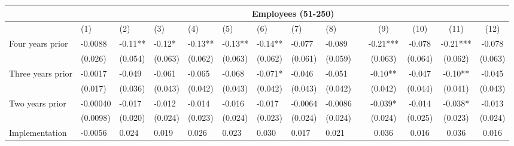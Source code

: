 \begin{tabular}{lccccrrrrrcccc}
\toprule
      & \multicolumn{13}{c}{Employees (51-250)} \\
\midrule
      & \multicolumn{1}{l}{(1)} & \multicolumn{1}{l}{(2)} & \multicolumn{1}{l}{(3)} & \multicolumn{1}{l}{(4)} & \multicolumn{1}{l}{(5)} & \multicolumn{1}{l}{(6)} & \multicolumn{1}{l}{(7)} & \multicolumn{1}{l}{(8)} &       & (9)   & (10)  & (11)  & (12) \\
\midrule
\midrule
Four years prior & \multicolumn{1}{l}{-0.0088} & \multicolumn{1}{l}{-0.11**} & \multicolumn{1}{l}{-0.12*} & \multicolumn{1}{l}{-0.13**} & \multicolumn{1}{l}{-0.13**} & \multicolumn{1}{l}{-0.14**} & \multicolumn{1}{l}{-0.077} & \multicolumn{1}{l}{-0.089} &       & -0.21*** & -0.078 & -0.21*** & -0.078 \\
      & \multicolumn{1}{l}{(0.026)} & \multicolumn{1}{l}{(0.054)} & \multicolumn{1}{l}{(0.063)} & \multicolumn{1}{l}{(0.062)} & \multicolumn{1}{l}{(0.063)} & \multicolumn{1}{l}{(0.062)} & \multicolumn{1}{l}{(0.061)} & \multicolumn{1}{l}{(0.059)} &       & (0.063) & (0.064) & (0.062) & (0.063) \\
Three years prior & \multicolumn{1}{l}{-0.0017} & \multicolumn{1}{l}{-0.049} & \multicolumn{1}{l}{-0.061} & \multicolumn{1}{l}{-0.065} & \multicolumn{1}{l}{-0.068} & \multicolumn{1}{l}{-0.071*} & \multicolumn{1}{l}{-0.046} & \multicolumn{1}{l}{-0.051} &       & -0.10** & -0.047 & -0.10** & -0.045 \\
      & \multicolumn{1}{l}{(0.017)} & \multicolumn{1}{l}{(0.036)} & \multicolumn{1}{l}{(0.043)} & \multicolumn{1}{l}{(0.042)} & \multicolumn{1}{l}{(0.043)} & \multicolumn{1}{l}{(0.042)} & \multicolumn{1}{l}{(0.043)} & \multicolumn{1}{l}{(0.042)} &       & (0.042) & (0.044) & (0.041) & (0.043) \\
Two years prior & \multicolumn{1}{l}{-0.00040} & \multicolumn{1}{l}{-0.017} & \multicolumn{1}{l}{-0.012} & \multicolumn{1}{l}{-0.014} & \multicolumn{1}{l}{-0.016} & \multicolumn{1}{l}{-0.017} & \multicolumn{1}{l}{-0.0064} & \multicolumn{1}{l}{-0.0086} &       & -0.039* & -0.014 & -0.038* & -0.013 \\
      & \multicolumn{1}{l}{(0.0098)} & \multicolumn{1}{l}{(0.020)} & \multicolumn{1}{l}{(0.024)} & \multicolumn{1}{l}{(0.023)} & \multicolumn{1}{l}{(0.024)} & \multicolumn{1}{l}{(0.023)} & \multicolumn{1}{l}{(0.024)} & \multicolumn{1}{l}{(0.024)} &       & (0.024) & (0.025) & (0.023) & (0.024) \\
Implementation & \multicolumn{1}{l}{-0.0056} & \multicolumn{1}{l}{0.024} & \multicolumn{1}{l}{0.019} & \multicolumn{1}{l}{0.026} & \multicolumn{1}{l}{0.023} & \multicolumn{1}{l}{0.030} & \multicolumn{1}{l}{0.017} & \multicolumn{1}{l}{0.021} &       & 0.036 & 0.016 & 0.036 & 0.016 \\

\end{tabular}
